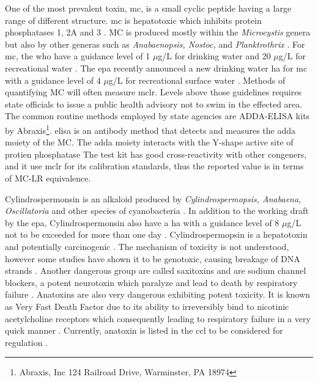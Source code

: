 One of the most prevalent toxin, \gls{mc}, is a small cyclic peptide having a large range of different structure. \gls{mc} is hepatotoxic which inhibits protein phosphatases 1, 2A and 3 \cite{moore_richard_cyanobacterial_1993}. MC is produced mostly within the \emph{Microcystis} genera but also by other generas such as \emph{Anabaenopsis,  Nostoc,} and \emph{Planktrothrix} \cite{rastogi_cyanotoxin-microcystins:_2014, davis_phylogenies_2014}. For \gls{mc}, the \gls{who} have a guidance level of 1 $\mu$g/L for drinking water and 20 $\mu$g/L for recreational water \cite{noauthor_guidelines_1998,noauthor_guidelines_2003}. The \gls{epa} recently announced a new drinking water \gls{ha} for \gls{mc} with a guidance level of 4 $\mu$g/L for recreational surface water \cite{usepa_draft_2016}. Methods of quantifying MC will often measure \gls{mclr}. Levels above those guidelines requires state officials to issue a public health advisory not to swim in the effected area.  The common routine methods employed by state agencies are ADDA-ELISA kits by Abraxis\footnote{Abraxis, Inc 124 Railroad Drive, Warminster, PA 18974}. \gls{elisa} is an antibody method that detects and measures the \gls{adda} moiety of the MC. The \gls{adda} moiety interacts with the Y-shape active site of protien phosphatase \cite{pereira_computational_2013} The test kit has good cross-reactivity with other congeners, and it use \gls{mclr} for its calibration standards, thus the reported value is in terms of MC-LR equivalence. 

Cylindrospermonsin is an alkaloid produced by \emph{Cylindrospermopsis, Anabaena, Oscillatoria} and other species of cyanobacteria \cite{dittmann_cyanobacterial_2012}. In addition to the working draft by the \gls{epa}, Cylindrospermonsin also have a \gls{ha} with a guidance level of 8 $\mu$g/L not to be exceeded for more than one day \cite{usepa_draft_2016}. Cylindrospermopsin is a hepatotoxin and potentially carcinogenic \cite{moreira_cylindrospermopsin:_2013}. The mechanism of toxicity is not understood, however some studies have shown it to be genotoxic, causing breakage of DNA strands \cite{alja_double_2013,kittler_1._2014}. Another dangerous group are called saxitoxins and are sodium channel blockers, a potent neurotoxin which paralyze and lead to death by respiratory failure \cite{moore_richard_cyanobacterial_1993}.  Anatoxins are also very dangerous exhibiting potent toxicity. It is known as Very Fast Death Factor due to its ability to irreversibly bind to nicotinic acetylcholine receptors which consequently leading to respiratory failure in a very quick manner \cite{codd_cyanobacterial_1999, moore_richard_cyanobacterial_1993}. Currently, anatoxin is listed in the \gls{ccl} to be considered for regulation \cite{usepa_drinking_2016}. 

